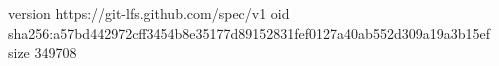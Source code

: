 version https://git-lfs.github.com/spec/v1
oid sha256:a57bd442972cff3454b8e35177d89152831fef0127a40ab552d309a19a3b15ef
size 349708
